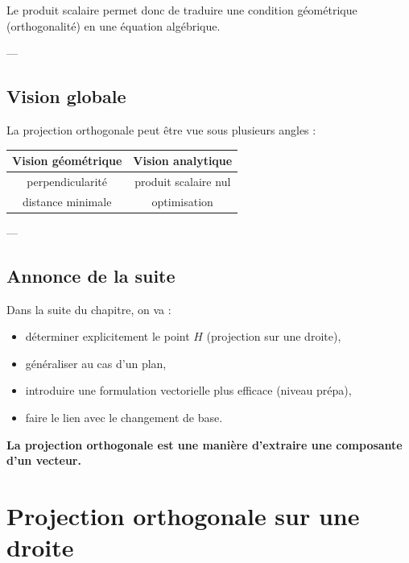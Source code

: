 \documentclass[11pt,a4paper]{article}
\begin{document}
Le produit scalaire permet donc de traduire une condition géométrique (orthogonalité)
en une équation algébrique.

---

\subsection{Vision globale}

La projection orthogonale peut être vue sous plusieurs angles :

\begin{center}
\begin{tabular}{|c|c|}
\hline
Vision géométrique & Vision analytique \\
\hline
perpendicularité & produit scalaire nul \\
\hline
distance minimale & optimisation \\
\hline
\end{tabular}
\end{center}

---

\subsection{Annonce de la suite}

Dans la suite du chapitre, on va :

\begin{itemize}
\item déterminer explicitement le point $H$ (projection sur une droite),
\item généraliser au cas d’un plan,
\item introduire une formulation vectorielle plus efficace (niveau prépa),
\item faire le lien avec le changement de base.
\end{itemize}

\bigskip

\begin{center}
\textbf{La projection orthogonale est une manière d’extraire une composante d’un vecteur.}
\end{center}
\section{Projection orthogonale sur une droite}
\end{document}
